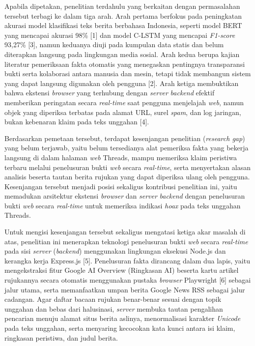 \documentclass[12pt,a4paper,twoside]{report}
\begin{document}
Apabila dipetakan, penelitian terdahulu yang berkaitan dengan permasalahan tersebut terbagi ke dalam tiga arah. Arah pertama berfokus pada peningkatan akurasi model klasifikasi teks berita berbahasa Indonesia, seperti model BERT yang mencapai akurasi 98\% [1] dan model C-LSTM yang mencapai \textit{F1-score} 93,27\% [3], namun keduanya diuji pada kumpulan data statis dan belum diterapkan langsung pada lingkungan media sosial. Arah kedua berupa kajian literatur pemeriksaan fakta otomatis yang menegaskan pentingnya transparansi bukti serta kolaborasi antara manusia dan mesin, tetapi tidak membangun sistem yang dapat langsung digunakan oleh pengguna [2]. Arah ketiga membuktikan bahwa ekstensi \textit{browser} yang terhubung dengan \textit{server} \textit{backend} efektif memberikan peringatan secara \textit{real-time} saat pengguna menjelajah \textit{web}, namun objek yang diperiksa terbatas pada alamat URL, surel \textit{spam}, dan log jaringan, bukan kebenaran klaim pada teks unggahan [4].

Berdasarkan pemetaan tersebut, terdapat kesenjangan penelitian (\textit{research gap}) yang belum terjawab, yaitu belum tersedianya alat pemeriksa fakta yang bekerja langsung di dalam halaman \textit{web} Threads, mampu memeriksa klaim peristiwa terbaru melalui penelusuran bukti \textit{web} secara \textit{real-time}, serta menyertakan alasan analisis beserta tautan berita rujukan yang dapat diperiksa ulang oleh pengguna. Kesenjangan tersebut menjadi posisi sekaligus kontribusi penelitian ini, yaitu memadukan arsitektur ekstensi \textit{browser} dan \textit{server} \textit{backend} dengan penelusuran bukti \textit{web} secara \textit{real-time} untuk memeriksa indikasi \textit{hoax} pada teks unggahan Threads.

Untuk mengisi kesenjangan tersebut sekaligus mengatasi ketiga akar masalah di atas, penelitian ini menerapkan teknologi penelusuran bukti \textit{web} secara \textit{real-time} pada sisi \textit{server} (\textit{backend}) menggunakan lingkungan eksekusi Node.js dan kerangka kerja Express.js [5]. Penelusuran fakta dirancang dalam dua lapis, yaitu mengekstraksi fitur Google AI Overview (Ringkasan AI) beserta kartu artikel rujukannya secara otomatis menggunakan pustaka \textit{browser} Playwright [6] sebagai jalur utama, serta memanfaatkan umpan berita Google News RSS sebagai jalur cadangan. Agar daftar bacaan rujukan benar-benar sesuai dengan topik unggahan dan bebas dari halusinasi, \textit{server} membuka tautan pengalihan pencarian menuju alamat situs berita aslinya, menormalisasi karakter \textit{Unicode} pada teks unggahan, serta menyaring kecocokan kata kunci antara isi klaim, ringkasan peristiwa, dan judul berita.
\end{document}
